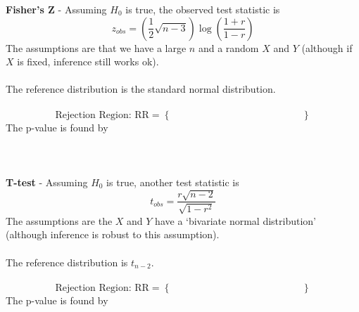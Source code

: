 \textbf{Fisher's Z} - Assuming $H_0$ is true, the observed test statistic is 
$$z_{obs}=\left(\frac{1}{2}\sqrt{n-3}\right)\log\left(\frac{1+r}{1-r}\right)$$
The assumptions are that we have a large $n$ and a random $X$ and $Y$ (although if $X$ is fixed, inference still works ok).\\~\\
The reference distribution is the standard normal distribution.  \\~\\
$$\mbox{Rejection Region: RR}=\left\{~~~~~~~~~~~~~~~~~~~~~~~~~~~~~~~~~~~~~~~~~~~~~~~~~~~~~~~~~~~~\right\}$$
The p-value is found by \\~\\~\\~\\
\textbf{T-test} - Assuming $H_0$ is true, another test statistic is
$$t_{obs}=\frac{r\sqrt{n-2}}{\sqrt{1-r^2}}$$
The assumptions are the $X$ and $Y$ have a `bivariate normal distribution' (although inference is robust to this assumption).\\~\\
The reference distribution is $t_{n-2}$.\\~\\
$$\mbox{Rejection Region: RR}=\left\{~~~~~~~~~~~~~~~~~~~~~~~~~~~~~~~~~~~~~~~~~~~~~~~~~~~~~~~~~~~~\right\}$$
The p-value is found by 

\newpage

